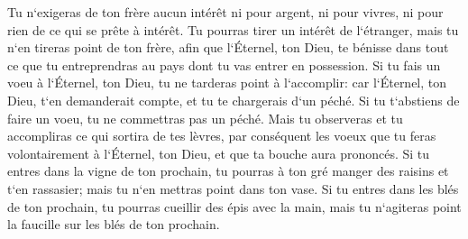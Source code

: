 \verse Tu n`exigeras de ton frère aucun intérêt ni pour argent, ni pour vivres, ni pour rien de ce qui se prête à intérêt. 
\verse Tu pourras tirer un intérêt de l`étranger, mais tu n`en tireras point de ton frère, afin que l`Éternel, ton Dieu, te bénisse dans tout ce que tu entreprendras au pays dont tu vas entrer en possession. 
\verse Si tu fais un voeu à l`Éternel, ton Dieu, tu ne tarderas point à l`accomplir: car l`Éternel, ton Dieu, t`en demanderait compte, et tu te chargerais d`un péché. 
\verse Si tu t`abstiens de faire un voeu, tu ne commettras pas un péché. 
\verse Mais tu observeras et tu accompliras ce qui sortira de tes lèvres, par conséquent les voeux que tu feras volontairement à l`Éternel, ton Dieu, et que ta bouche aura prononcés. 
\verse Si tu entres dans la vigne de ton prochain, tu pourras à ton gré manger des raisins et t`en rassasier; mais tu n`en mettras point dans ton vase. 
\verse Si tu entres dans les blés de ton prochain, tu pourras cueillir des épis avec la main, mais tu n`agiteras point la faucille sur les blés de ton prochain. 

